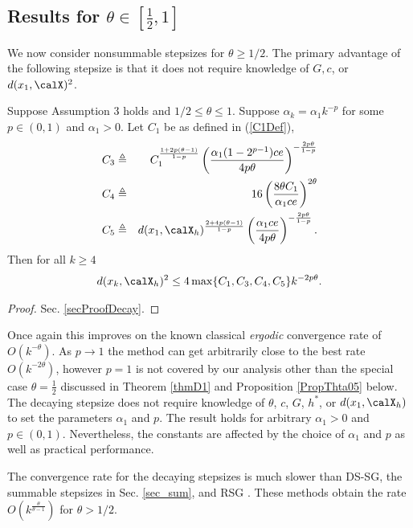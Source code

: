 \subsection{Results for $\theta\in[\frac{1}{2},1]$}
We now consider nonsummable stepsizes for $\theta\geq 1/2$. The primary advantage of the following stepsize is that it does not require knowledge of $G,c$, or $d(x_1,\calX)^2$. 
\begin{theorem}\label{ThmLargeTheta}
Suppose Assumption 3 holds and $1/2\leq \theta\leq 1$.
Suppose $\alpha_k = \alpha_1 k^{-p}$ for some $p\in(0,1)$ and $\alpha_1>0$. Let $C_1$ be as defined in (\ref{C1Def}), 
\begin{eqnarray*}
C_3 &\triangleq& C_1^{\frac{1+2p(\theta-1)}{1-p}}
\left(
\frac{\alpha_1(1-2^{p-1}) c e}{4p\theta}
\right)^{-\frac{2 p\theta}{1-p}}
\\
C_4 &\triangleq& 16 \left(\frac{8\theta C_1}{\alpha_1 c e}\right)^{2\theta}
\\
C_5 &\triangleq& d(x_1,\calX_h)^{\frac{2+4p(\theta-1)}{1-p}}\left(
\frac{\alpha_1 c e}{4p\theta}
\right)^{-\frac{2 p\theta}{1-p}}.
\end{eqnarray*}
Then for all $k\geq 4$
\begin{eqnarray}\label{BigThetaResult}
d(x_k,\calX_h)^2\leq 4\max\{C_1,C_3,C_4,C_5\}k^{-2p\theta}.
\end{eqnarray}
\end{theorem}
\begin{proof}
Sec. \ref{secProofDecay}.
\end{proof}

Once again this improves on the known classical \emph{ergodic}  convergence rate of $O(k^{-\theta})$. As $p\to1$ the method can get arbitrarily close to the best rate $O(k^{-2\theta})$, however $p=1$ is not covered by our analysis other than the special case $\theta=\frac{1}{2}$ discussed in Theorem \ref{thmD1} and Proposition \ref{PropThta05} below. The decaying stepsize does not require knowledge of $\theta$, $c$, $G$, $h^*$, or $d(x_1,\calX_h)$ to set the parameters $\alpha_1$ and $p$. 
The result holds for arbitrary $\alpha_1>0$ and $p\in(0,1)$. Nevertheless, the constants are affected by the choice of $\alpha_1$ and $p$ as well as practical performance.

The convergence rate for the decaying stepsizes is much slower than DS-SG, the summable stepsizes in Sec. \ref{sec_sum}, and RSG \cite{yang2015rsg}. These methods obtain the rate $O\left(k^{\frac{\theta}{\theta-1}}\right)$ for $\theta>1/2$. 

